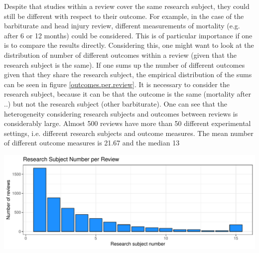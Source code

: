 Despite that studies within a review cover the same research subject, they could still be different with respect to their outcome. For example, in the case of the barbiturate and head injury review, different measurements of mortality (e.g. after 6 or 12 months) could be considered. This is of particular importance if one is to compare the results directly. Considering this, one might want to look at the distribution of number of different outcomes within a review (given that the research subject is the same). If one sums up the number of different outcomes given that they share the research subject, the empirical distribution of the sums can be seen in figure \ref{outcomes.per.review}. It is necessary to consider the research subject, because it can be that the outcome is the same (mortality after ..) but not the research subject (other barbiturate). One can see that the heterogeneity considering research subjects and outcomes between reviews is considerably large. Almost 500 reviews have more than 50 different experimental settings, i.e. different research subjects and outcome measures. The mean number of different outcome measures is 21.67 and the median 13 

\label{outcomes.per.review}
\begin{knitrout}
\color{fgcolor}

{\centering \includegraphics[width=\textwidth-3cm]{figure/ch02_figunnamed-chunk-5-1} 

}



\end{knitrout}























































